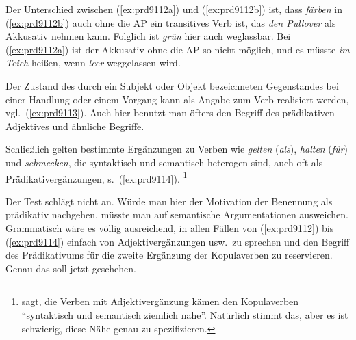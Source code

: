 Der Unterschied zwischen (\ref{ex:prd9112a}) und (\ref{ex:prd9112b}) ist, dass \textit{färben} in (\ref{ex:prd9112b}) auch ohne die AP ein transitives Verb ist, das \textit{den Pullover} als Akkusativ nehmen kann.
Folglich ist \textit{grün} hier auch weglassbar.
Bei (\ref{ex:prd9112a}) ist der Akkusativ ohne die AP so nicht möglich, und es müsste \textit{im Teich} heißen, wenn \textit{leer} weggelassen wird.

Der Zustand des durch ein Subjekt oder Objekt bezeichneten Gegenstandes bei einer Handlung oder einem Vorgang kann als Angabe zum Verb realisiert werden, vgl.\ (\ref{ex:prd9113}).
Auch hier benutzt man öfters den Begriff des prädikativen Adjektives und ähnliche Begriffe.

\begin{exe}
\end{exe}

Schließlich gelten bestimmte Ergänzungen zu Verben wie \textit{gelten} (\textit{als}), \textit{halten} (\textit{für}) und \textit{schmecken}, die syntaktisch und semantisch heterogen sind, auch oft als Prädikativergänzungen, s.\ (\ref{ex:prd9114}).%
\footnote{\citet[80]{Eisenberg2} sagt, die Verben mit Adjektivergänzung kämen den Kopulaverben "`syntaktisch und semantisch ziemlich nahe"'.
Natürlich stimmt das, aber es ist schwierig, diese Nähe genau zu spezifizieren.}

\begin{exe}
  \ex\label{ex:prd9114} 
  \begin{xlist}
  \end{xlist}
\end{exe}

Der Test schlägt nicht an.
Würde man hier der Motivation der Benennung als prädikativ nachgehen, müsste man auf semantische Argumentationen ausweichen.
Grammatisch wäre es völlig ausreichend, in allen Fällen von (\ref{ex:prd9112}) bis (\ref{ex:prd9114}) einfach von Adjektivergänzungen usw.\ zu sprechen und den Begriff des Prädikativums für die zweite Ergänzung der Kopulaverben zu reservieren.
Genau das soll jetzt geschehen.

